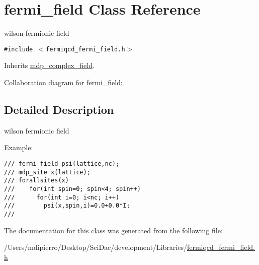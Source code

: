 \hypertarget{classfermi__field}{
\section{fermi\_\-field Class Reference}
\label{classfermi__field}
}
wilson fermionic field  


{\tt \#include $<$fermiqcd\_\-fermi\_\-field.h$>$}

Inherits \hyperlink{classmdp__complex__field}{mdp\_\-complex\_\-field}.

Collaboration diagram for fermi\_\-field:

\subsection{Detailed Description}
wilson fermionic field 

Example: 

\footnotesize\begin{verbatim}
/// fermi_field psi(lattice,nc);
/// mdp_site x(lattice);
/// forallsites(x)
///    for(int spin=0; spin<4; spin++)
///      for(int i=0; i<nc; i++)
///        psi(x,spin,i)=0.0+0.0*I;
/// \end{verbatim}
\normalsize
 

The documentation for this class was generated from the following file:\begin{CompactItemize}
\item 
/Users/mdipierro/Desktop/SciDac/development/Libraries/\hyperlink{fermiqcd__fermi__field_8h}{fermiqcd\_\-fermi\_\-field.h}\end{CompactItemize}
